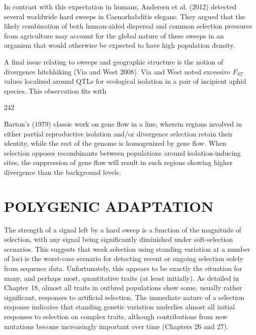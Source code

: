 \documentclass{article}
\begin{document}
In contrast with this expectation in humans, Andersen et al. (2012) detected several worldwide hard sweeps in Caenorhabditis elegans. They argued that the likely combination of both human-aided dispersal and common selection pressures from agriculture may account for the global nature of these sweeps in an organism that would otherwise be expected to have high population density.

A final issue relating to sweeps and geographic structure is the notion of divergence hitchhiking (Via and West 2008). Via and West noted excessive  $ F_{ST} $ values localized around QTLs for ecological isolation in a pair of incipient aphid species. This observation fits with

242

Barton’s (1979) classic work on gene flow in a line, wherein regions involved in either partial reproductive isolation and/or divergence selection retain their identity, while the rest of the genome is homogenized by gene flow. When selection opposes recombinants between populations around isolation-inducing sites, the suppression of gene flow will result in such regions showing higher divergence than the background levels.

\section{POLYGENIC ADAPTATION}
The strength of a signal left by a hard sweep is a function of the magnitude of selection, with any signal being significantly diminished under soft-selection scenarios. This suggests that weak selection using standing variation at a number of loci is the worst-case scenario for detecting recent or ongoing selection solely from sequence data. Unfortunately, this appears to be exactly the situation for many, and perhaps most, quantitative traits (at least initially). As detailed in Chapter 18, almost all traits in outbred populations show some, usually rather significant, responses to artificial selection. The immediate nature of a selection response indicates that standing genetic variation underlies almost all initial responses to selection on complex traits, although contributions from new mutations become increasingly important over time (Chapters 26 and 27).
\end{document}

